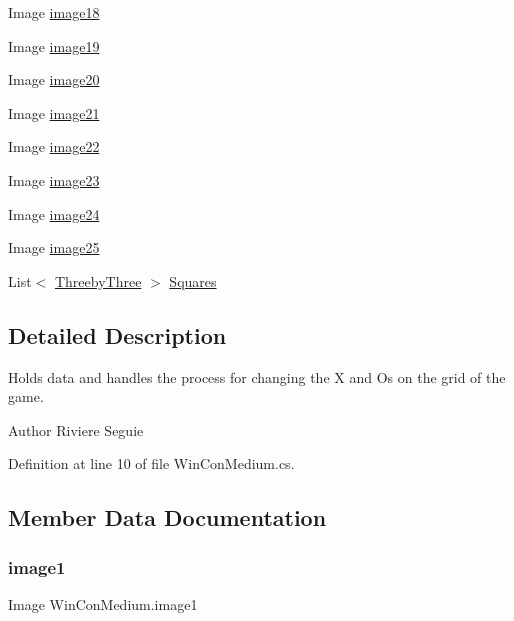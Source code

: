 \begin{DoxyCompactItemize}
Image \mbox{\hyperlink{class_win_con_medium_a5316b9af56841f331520bb17750a039d}{image18}}
\item 
Image \mbox{\hyperlink{class_win_con_medium_a66372c51e63d257dd5cc7ad3ab1fb748}{image19}}
\item 
Image \mbox{\hyperlink{class_win_con_medium_ade09bf415ec0571a7a10157e458b9486}{image20}}
\item 
Image \mbox{\hyperlink{class_win_con_medium_aa2556229ff76450bc57542bf4c5df3e3}{image21}}
\item 
Image \mbox{\hyperlink{class_win_con_medium_a1532c90386f312644ce849bbf1406f18}{image22}}
\item 
Image \mbox{\hyperlink{class_win_con_medium_adf305047a02e55954b1a8448293d51e2}{image23}}
\item 
Image \mbox{\hyperlink{class_win_con_medium_a4425ad766a840cb323156f865145910a}{image24}}
\item 
Image \mbox{\hyperlink{class_win_con_medium_a8c43f4613a6b0d719e50c6ee2e6bc58e}{image25}}
\item 
List$<$ \mbox{\hyperlink{class_threeby_three}{Threeby\+Three}} $>$ \mbox{\hyperlink{class_win_con_medium_a693c73d3a2ba5333e30b33bc43f1842e}{Squares}}
\end{DoxyCompactItemize}


\subsection{Detailed Description}
Holds data and handles the process for changing the X and Os on the grid of the game. \begin{DoxyAuthor}{Author}
Riviere Seguie 
\end{DoxyAuthor}


Definition at line 10 of file Win\+Con\+Medium.\+cs.



\subsection{Member Data Documentation}
\mbox{\label{class_win_con_medium_a82af2f2151310356db41094d3462959d}} 
\subsubsection{\texorpdfstring{image1}{image1}}
{\footnotesize\ttfamily Image Win\+Con\+Medium.\+image1}

